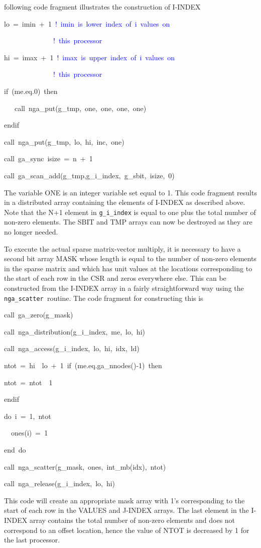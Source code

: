 following code fragment illustrates the construction of I-INDEX
\begin{lyxcode}
lo~=~imin~+~1~\textcolor{blue}{!~imin~is~lower~index~of~i~values~on~}

\textcolor{blue}{{}~~~~~~~~~~~~~~!~this~processor~}

hi~=~imax~+~1~\textcolor{blue}{!~imax~is~upper~index~of~i~values~on~}

\textcolor{blue}{{}~~~~~~~~~~~~~~!~this~processor~}

if~(me.eq.0)~then~

~~~call~nga\_put(g\_tmp,~one,~one,~one,~one)~

endif~

call~nga\_put(g\_tmp,~lo,~hi,~inc,~one)~

call~ga\_sync~isize~=~n~+~1~

call~ga\_scan\_add(g\_tmp,g\_i\_index,~g\_sbit,~isize,~0)
\end{lyxcode}
The variable ONE is an integer variable set equal to 1. This code
fragment results in a distributed array containing the elements of
I-INDEX as described above. Note that the N+1 element in \texttt{g\_i\_index}
is equal to one plus the total number of non-zero elements. The SBIT
and TMP arrays can now be destroyed as they are no longer needed.

To execute the actual sparse matrix-vector multiply, it is necessary
to have a second bit array MASK whose length is equal to the number
of non-zero elements in the sparse matrix and which has unit values
at the locations corresponding to the start of each row in the CSR
and zeros everywhere else. This can be constructed from the I-INDEX
array in a fairly straightforward way using the \texttt{nga\_scatter
}routine. The code fragment for constructing this is
\begin{lyxcode}
call~ga\_zero(g\_mask)~

call~nga\_distribution(g\_i\_index,~me,~lo,~hi)~

call~nga\_access(g\_i\_index,~lo,~hi,~idx,~ld)~

ntot~=~hi~\textendash{}~lo~+~1~if~(me.eq.ga\_nnodes()-1)~then~

ntot~=~ntot~\textendash{}~1~

endif~

do~i~=~1,~ntot~

~~ones(i)~=~1~

end~do~

call~nga\_scatter(g\_mask,~ones,~int\_mb(idx),~ntot)~

call~nga\_release(g\_i\_index,~lo,~hi)
\end{lyxcode}
This code will create an appropriate mask array with 1\textquoteright{}s
corresponding to the start of each row in the VALUES and J-INDEX arrays.
The last element in the I-INDEX array contains the total number of
non-zero elements and does not correspond to an offset location, hence
the value of NTOT is decreased by 1 for the last processor.

